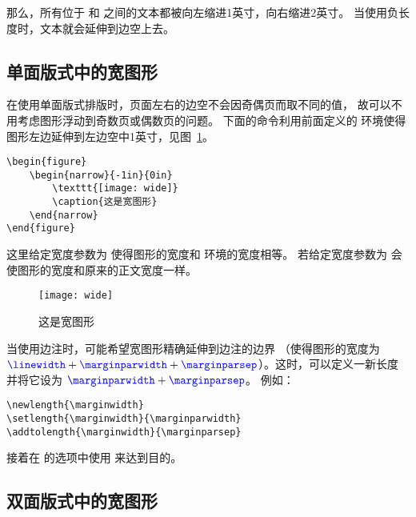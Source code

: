 那么，所有位于  和  之间的文本都被向左缩进1英寸，向右缩进2英寸。
当使用负长度时，文本就会延伸到边空上去。

\subsection{单面版式中的宽图形}\label{ssec:widefig-oneside}

在使用单面版式排版时，页面左右的边空不会因奇偶页而取不同的值，
故可以不用考虑图形浮动到奇数页或偶数页的问题。
下面的命令利用前面定义的  环境使得图形左边延伸到左边空中1英寸，见图~\ref{fig:widefig}。
\begin{lstlisting}
\begin{figure}
	\begin{narrow}{-1in}{0in}
		\texttt{[image: wide]}
		\caption{这是宽图形}
	\end{narrow}
\end{figure}
\end{lstlisting}
这里给定宽度参数为  使得图形的宽度和  环境的宽度相等。
若给定宽度参数为  会使图形的宽度和原来的正文宽度一样。

\begin{figure}
	\begin{narrow}{-1in}{0in}
		\texttt{[image: wide]}
		\caption{这是宽图形}\label{fig:widefig}
	\end{narrow}
\end{figure}

当使用边注时，可能希望宽图形精确延伸到边注的边界
（使得图形的宽度为 $\text{\cmd{linewidth}}+\text{\cmd{marginparwidth}}+\text{\cmd{marginparsep}}$）。这时，可以定义一新长度  并将它设为 $\text{\cmd{marginparwidth}}+\text{\cmd{marginparsep}}$。
例如：
\begin{lstlisting}
\newlength{\marginwidth} 
\setlength{\marginwidth}{\marginparwidth} 
\addtolength{\marginwidth}{\marginparsep}
\end{lstlisting}
接着在  的选项中使用  来达到目的。

\subsection{双面版式中的宽图形}\label{widefig-twoside}


